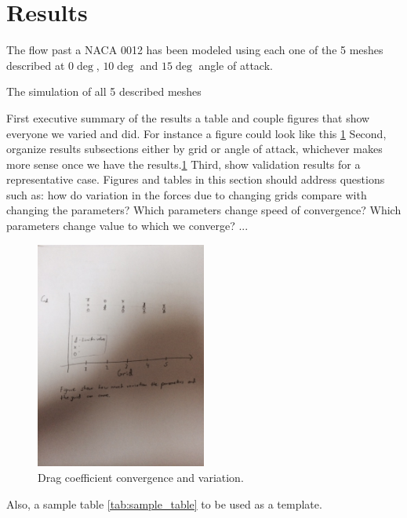 
\section{Results}
The flow past a NACA 0012 has been modeled using each one of the 5 meshes described at $0\deg$, $10\deg$ and $15\deg$ angle of attack.  




The simulation of all 5 described meshes 











First executive summary of the results a table and couple figures that show everyone we varied and did. For instance a figure could look like this \cref{fig:Cd_convergence}
Second, organize results subsections either by grid or angle of attack, whichever makes more sense once we have the results.\cref{fig:Cd_convergence}
Third, show validation results for a representative case.
Figures and tables in this section should address questions such as: how do variation in the forces due to changing grids compare with changing the parameters? Which parameters change speed of convergence? Which parameters change value to which we converge? ...

\begin{figure}
  \centering
  \includegraphics[width=0.5\textwidth]{./fig/cd_convergence}
  \caption{Drag coefficient convergence and variation.}
  \label{fig:Cd_convergence}
\end{figure}

Also, a sample table \cref{tab:sample_table} to be used as a template.

